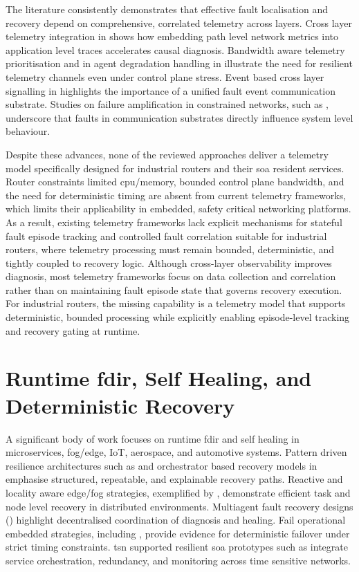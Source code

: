 The literature consistently demonstrates that effective fault localisation and recovery depend on comprehensive, correlated telemetry across layers. Cross layer telemetry integration in \cite{ref13} shows how embedding path level network metrics into application level traces accelerates causal diagnosis. Bandwidth aware telemetry prioritisation and in agent degradation handling in \cite{ref14} illustrate the need for resilient telemetry channels even under control plane stress. Event based cross layer signalling in \cite{ref15} highlights the importance of a unified fault event communication substrate. Studies on failure amplification in constrained networks, such as \cite{ref16}, underscore that faults in communication substrates directly influence system level behaviour.

Despite these advances, none of the reviewed approaches deliver a telemetry model specifically designed for industrial routers and their \gls{soa} resident services. Router constraints limited \gls{cpu}/memory, bounded control plane bandwidth, and the need for deterministic timing are absent from current telemetry frameworks, which limits their applicability in embedded, safety critical networking platforms. As a result, existing telemetry frameworks lack explicit mechanisms for stateful fault episode tracking and controlled fault correlation suitable for industrial routers, where telemetry processing must remain bounded, deterministic, and tightly coupled to recovery logic. Although cross-layer observability improves diagnosis, most telemetry frameworks focus on data collection and correlation rather than on maintaining fault episode state that governs recovery execution. For industrial routers, the missing capability is a telemetry model that supports deterministic, bounded processing while explicitly enabling episode-level tracking and recovery gating at runtime.

\section{Runtime \gls{fdir}, Self Healing, and Deterministic Recovery}\label{sec:lit-fdir-recovery}

A significant body of work focuses on runtime \gls{fdir} and self healing in microservices, fog/edge, IoT, aerospace, and automotive systems. Pattern driven resilience architectures such as \cite{ref17} and orchestrator based recovery models in \cite{ref18,ref19} emphasise structured, repeatable, and explainable recovery paths. Reactive and locality aware edge/fog strategies, exemplified by \cite{ref20}, demonstrate efficient task and node level recovery in distributed environments. Multiagent fault recovery designs (\cite{ref21,ref22}) highlight decentralised coordination of diagnosis and healing. Fail operational embedded strategies, including \cite{ref23,ref24,ref25}, provide evidence for deterministic failover under strict timing constraints. \gls{tsn} supported resilient \gls{soa} prototypes such as \cite{ref26} integrate service orchestration, redundancy, and monitoring across time sensitive networks.

